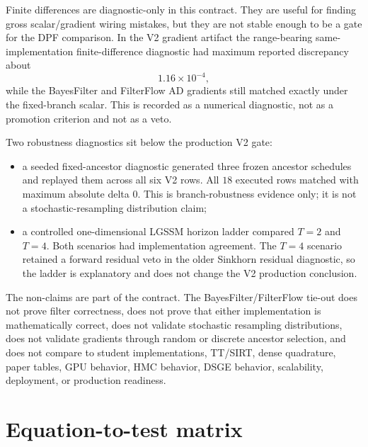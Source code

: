 Finite differences are diagnostic-only in this contract.  They are useful for
finding gross scalar/gradient wiring mistakes, but they are not stable enough
to be a gate for the DPF comparison.  In the V2 gradient artifact the
range-bearing same-implementation finite-difference diagnostic had maximum
reported discrepancy about
\[
  1.16\times 10^{-4},
\]
while the BayesFilter and FilterFlow AD gradients still matched exactly under
the fixed-branch scalar.  This is recorded as a numerical diagnostic, not as a
promotion criterion and not as a veto.

Two robustness diagnostics sit below the production V2 gate:
\begin{itemize}
  \item a seeded fixed-ancestor diagnostic generated three frozen ancestor
    schedules and replayed them across all six V2 rows.  All \(18\) executed
    rows matched with maximum absolute delta \(0\).  This is branch-robustness
    evidence only; it is not a stochastic-resampling distribution claim;
  \item a controlled one-dimensional LGSSM horizon ladder compared \(T=2\) and
    \(T=4\).  Both scenarios had implementation agreement.  The \(T=4\)
    scenario retained a forward residual veto in the older Sinkhorn residual
    diagnostic, so the ladder is explanatory and does not change the V2
    production conclusion.
\end{itemize}

The non-claims are part of the contract.  The BayesFilter/FilterFlow tie-out
does not prove filter correctness, does not prove that either implementation is
mathematically correct, does not validate stochastic resampling distributions,
does not validate gradients through random or discrete ancestor selection, and
does not compare to student implementations, TT/SIRT, dense quadrature, paper
tables, GPU behavior, HMC behavior, DSGE behavior, scalability, deployment, or
production readiness.

\section{Equation-to-test matrix}
\label{sec:bf-dpf-debug-equation-test-matrix}

